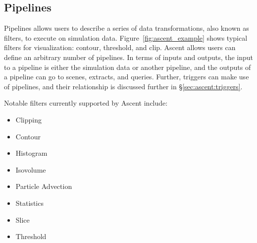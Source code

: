 

\subsection{Pipelines}

Pipelines allows users to describe a series of data transformations, also known as filters,
to execute on simulation data.
%
Figure~\ref{fig:ascent_example} shows
typical filters for visualization: contour, threshold, and clip.
%
Ascent allows users can define an arbitrary number of pipelines.
%
In terms of inputs and outputs, the input to a pipeline is either
the simulation data or another pipeline, and the outputs of a pipeline
can go to scenes, extracts, and queries.
%
Further, triggers can make use of pipelines, and their relationship is discussed further
in \S\ref{sec:ascent:triggers}.

%


Notable filters currently supported by Ascent include:
\begin{multicols}{2}
\begin{itemize}
\item Clipping
\item Contour
\item Histogram
\item Isovolume
\item Particle Advection
\item Statistics
\item Slice
\item Threshold
\end{itemize}
\end{multicols}

